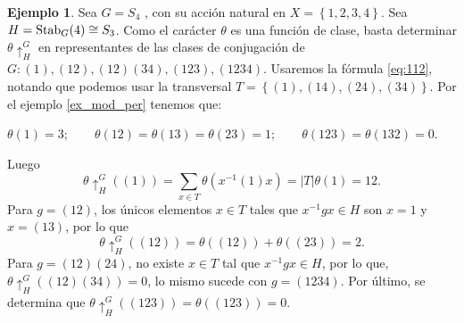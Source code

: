 \documentclass[12pt]{book}
\theoremstyle{definition}
\newtheorem{example}[theorem]{Ejemplo}
\newcounter{in}
\begin{document}
\begin{example}
  Sea $G = S_4$ , con su acción natural en
  $X = \left \{ 1, 2, 3, 4 \right \}$. Sea
  $H = \textup{Stab}_{G}(4) \cong S_3$. Como el carácter $\theta$ es
  una función de clase, basta determinar $\theta\uparrow^{G}_{H}$ en
  representantes de las clases de conjugación de
  $G: (1), (12), (12)(34), (123), (1234)$.  Usaremos la fórmula
  \ref{eq:112}, notando que podemos usar la transversal
  $T = \left \{ (1), (14), (24), (34) \right \}$.  Por el ejemplo
  \ref{ex_mod_per} tenemos que:
\begin{center}
     $\theta(1)=3; \qquad  \theta(12) = \theta(13) = \theta(23) = 1; \qquad \theta(123) = \theta(132) = 0.$
   \end{center}
Luego
\begin{equation}
\theta\uparrow^{G}_{H}((1)) = \sum_{x \in T} \theta(x^{-1}(1)x) = |T|\theta(1) = 12.
\end{equation}
Para $g = (12)$, los únicos elementos $x \in T$ tales que $x^{-1}gx \in H$ son $x = 1$ y $x = (13)$, por lo que
\begin{equation}
\theta\uparrow^{G}_{H}((12)) = \theta((12)) + \theta((23)) = 2.
\end{equation}
Para $g = (12)(24)$, no existe $x \in T$ tal que $x^{-1}gx \in H$, por lo que, $\theta\uparrow^{G}_{H}((12)(34)) = 0$, lo mismo sucede con $g = (1234)$. Por último, se determina que $\theta\uparrow^{G}_{H}((123)) = \theta((123)) = 0$.
\end{example}
\end{document}
